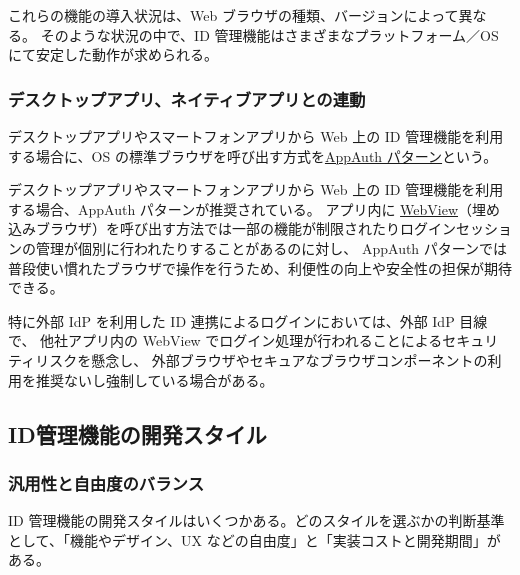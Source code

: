\documentclass[uplatex]{jsarticle}
\def\label#1{}%
\begin{document}
\begin{rem}[ブラウザごとの差異]\label{rem:ch6-browser-differences}
これらの機能の導入状況は、Web ブラウザの種類、バージョンによって異なる。
そのような状況の中で、ID 管理機能はさまざまなプラットフォーム／OS にて安定した動作が求められる。
\end{rem}

\subsubsection{デスクトップアプリ、ネイティブアプリとの連動}

\begin{dfn}\label{dfn:ch6-appauth}
デスクトップアプリやスマートフォンアプリから Web 上の ID 管理機能を利用する場合に、OS の標準ブラウザを呼び出す方式を\underline{AppAuth パターン}という。
\end{dfn}

デスクトップアプリやスマートフォンアプリから Web 上の ID 管理機能を利用する場合、AppAuth パターンが推奨されている。
アプリ内に \underline{WebView}（埋め込みブラウザ）を呼び出す方法では一部の機能が制限されたりログインセッションの管理が個別に行われたりすることがあるのに対し、
AppAuth パターンでは普段使い慣れたブラウザで操作を行うため、利便性の向上や安全性の担保が期待できる。

\begin{rem}\label{rem:ch6-external-idp-browser}
特に外部 IdP を利用した ID 連携によるログインにおいては、外部 IdP 目線で、
他社アプリ内の WebView でログイン処理が行われることによるセキュリティリスクを懸念し、
外部ブラウザやセキュアなブラウザコンポーネントの利用を推奨ないし強制している場合がある。
\end{rem}

\subsection{ID管理機能の開発スタイル}\label{subsec:ch6-development-styles}

\subsubsection{汎用性と自由度のバランス}

ID 管理機能の開発スタイルはいくつかある。どのスタイルを選ぶかの判断基準として、「機能やデザイン、UX などの自由度」と「実装コストと開発期間」がある。
\end{document}
